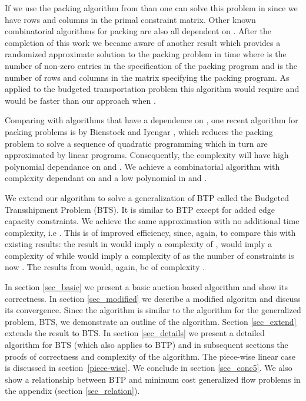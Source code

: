 \documentclass[11pt]{article}
\newcommand{\ignore}[1]{ }
\begin{document}
If we use the packing algorithm from \cite{garg98faster} than 
one can solve this problem in
 since we have  rows and  columns
in the primal constraint matrix. Other known combinatorial
algorithms for packing \cite{PST95,GK94}
are also all dependent on .  
After the completion of this work we became aware of 
another result \cite{kouf-young}
which provides a randomized  approximate solution to the 
packing problem in time  where
 is the number of non-zero entries in the specification of
the packing program and  is the number of rows and columns in the
matrix specifying the packing program. As applied to the budgeted
transportation problem this algorithm would 
require  and  would be faster
than our approach when .  

Comparing with algorithms that have a dependence on ,
one recent algorithm for packing problems
is by Bienstock and Iyengar \cite{bienstock:2006}, 
which reduces the packing problem to solve a sequence of 
quadratic programming which in turn are approximated by linear programs.
Consequently, the complexity will have high polynomial dependance on  and
.
We achieve a combinatorial algorithm with 
complexity dependant on  and a low  polynomial
in  and .

\ignore{
Note that the approximation to the budgeted transportation problem does 
not immediately provide an algorithm for the generalized flow problem in general graphs 
since the approximation guarantee does not translate back.
}
We extend our algorithm to solve a generalization of BTP called
the  Budgeted Transshipment 
Problem (BTS). It is similar to BTP except for added edge capacity constraints. 
We achieve the same approximation with no additional time complexity,
i.e .
This is of improved efficiency, 
since, again, to compare this with existing results: the result in \cite{wayne99apolynomial} 
would imply a complexity of
, \cite{fleischer99fast} 
would imply a complexity of
 while  \cite{garg98faster} would imply
a complexity of 
as the number of constraints is now .
The results from \cite{kouf-young} would, again, be of complexity
.


In section \ref{sec_basic}
we present a basic auction based algorithm and show its correctness. In section \ref{sec_modified}
we describe a modified algoritm and discuss its convergence. Since the algorithm is similar to the algorithm for the generalized
problem, BTS, we demonstrate an outline of the algorithm.
Section \ref{sec_extend} extends the result to BTS. In section
\ref{sec_details} we present a detailed algorithm for BTS (which also applies to BTP)
and in subsequent sections the proofs of correctness and complexity of the 
algorithm. The piece-wise linear case is discussed in section~\ref{piece-wise}. 
We conclude in  section \ref{sec_conc5}.
We also  show a relationship between  BTP and  minimum cost generalized flow problems in the appendix (section \ref{sec_relation}). 
\end{document}

